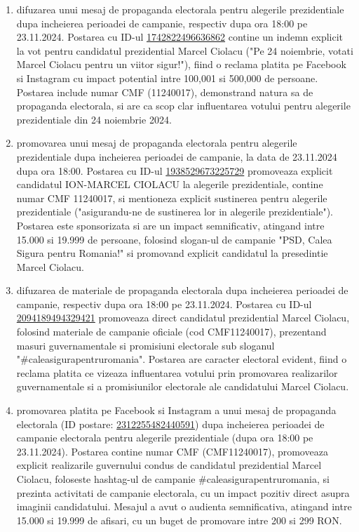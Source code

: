 \documentclass[a4paper,12pt]{article}
\begin{document}
\begin{enumerate}[leftmargin=*, label=\arabic*.)]
    \item difuzarea unui mesaj de propaganda electorala pentru alegerile prezidentiale dupa incheierea perioadei de campanie, respectiv dupa ora 18:00 pe 23.11.2024. Postarea cu ID-ul \href{https://www.facebook.com/ads/library/?id=1742822496636862}{1742822496636862} contine un indemn explicit la vot pentru candidatul prezidential Marcel Ciolacu ("Pe 24 noiembrie, votati Marcel Ciolacu pentru un viitor sigur!"), fiind o reclama platita pe Facebook si Instagram cu impact potential intre 100,001 si 500,000 de persoane. Postarea include numar CMF (11240017), demonstrand natura sa de propaganda electorala, si are ca scop clar influentarea votului pentru alegerile prezidentiale din 24 noiembrie 2024.
    \item promovarea unui mesaj de propaganda electorala pentru alegerile prezidentiale dupa incheierea perioadei de campanie, la data de 23.11.2024 dupa ora 18:00. Postarea cu ID-ul \href{https://www.facebook.com/ads/library/?id=1938529673225729}{1938529673225729} promoveaza explicit candidatul ION-MARCEL CIOLACU la alegerile prezidentiale, contine numar CMF 11240017, si mentioneza explicit sustinerea pentru alegerile prezidentiale ("asigurandu-ne de sustinerea lor in alegerile prezidentiale"). Postarea este sponsorizata si are un impact semnificativ, atingand intre 15.000 si 19.999 de persoane, folosind slogan-ul de campanie "PSD, Calea Sigura pentru Romania!" si promovand explicit candidatul la presedintie Marcel Ciolacu.
    \item difuzarea de materiale de propaganda electorala dupa incheierea perioadei de campanie, respectiv dupa ora 18:00 pe 23.11.2024. Postarea cu ID-ul \href{https://www.facebook.com/ads/library/?id=2094189494329421}{2094189494329421} promoveaza direct candidatul prezidential Marcel Ciolacu, folosind materiale de campanie oficiale (cod CMF11240017), prezentand masuri guvernamentale si promisiuni electorale sub sloganul "\#caleasigurapentruromania". Postarea are caracter electoral evident, fiind o reclama platita ce vizeaza influentarea votului prin promovarea realizarilor guvernamentale si a promisiunilor electorale ale candidatului Marcel Ciolacu.
    \item promovarea platita pe Facebook si Instagram a unui mesaj de propaganda electorala (ID postare: \href{https://www.facebook.com/ads/library/?id=2312255482440591}{2312255482440591}) dupa incheierea perioadei de campanie electorala pentru alegerile prezidentiale (dupa ora 18:00 pe 23.11.2024). Postarea contine numar CMF (CMF11240017), promoveaza explicit realizarile guvernului condus de candidatul prezidential Marcel Ciolacu, foloseste hashtag-ul de campanie \#caleasigurapentruromania, si prezinta activitati de campanie electorala, cu un impact pozitiv direct asupra imaginii candidatului. Mesajul a avut o audienta semnificativa, atingand intre 15.000 si 19.999 de afisari, cu un buget de promovare intre 200 si 299 RON.

\end{enumerate}
\end{document}
